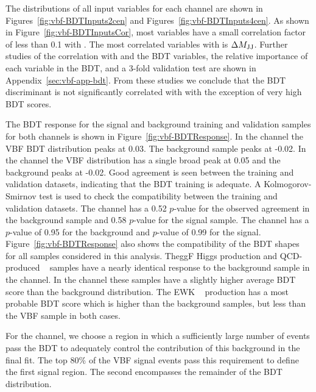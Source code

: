The distributions of all input variables for each channel are
shown in Figures~\ref{fig:vbf-BDTInputs2cen} and Figures~\ref{fig:vbf-BDTInputs4cen}.
As shown in Figure~\ref{fig:vbf-BDTInputsCor}, most variables have a
small correlation factor of less than 0.1 with \Mbb.
The most correlated variables with \Mbb is $\Delta M_{\rm JJ}$.
Further studies of the correlation with \Mbb and the BDT variables,
the relative importance of each variable in the BDT, and a 3-fold
validation test are shown in Appendix~\ref{sec:vbf-app-bdt}.
From these studies we conclude that the BDT discriminant is not
significantly correlated with \Mbb with the exception of very high BDT scores.

The BDT response for  the signal and background training and validation
samples for both channels is shown in Figure~\ref{fig:vbf-BDTResponse}.
In the \fourcentral channel the VBF \Hbb BDT distribution peaks at 0.03.
The background sample peaks at -0.02.  In the \twocentral channel the
VBF \Hbb distribution has a single broad peak at 0.05 and the
background peaks at -0.02. Good agreement is seen between the training
and validation datasets, indicating that the BDT training is adequate.
A Kolmogorov-Smirnov test is used to check the compatibility between
the training and validation datasets.  The \twocentral channel has
a 0.52 $p$-value for the observed agreement in the background sample
and 0.58 $p$-value for the signal sample. The \fourcentral channel has
a $p$-value of 0.95 for the background and $p$-value of 0.99 for the signal.
Figure~\ref{fig:vbf-BDTResponse} also shows the compatibility of the BDT
shapes for all samples considered in this analysis.
TheggF Higgs production and QCD-produced \zjets ~ samples have a
nearly identical response to the background sample in the \fourcentral channel.
In the \twocentral channel these samples have a slightly higher average BDT score than the background distribution.
The EWK \zjets ~ production has a most probable BDT score which is higher than the
background samples, but less than the VBF \Hbb sample in both cases. 

For the \twocentral channel, we choose a region in which
a sufficiently large number of \zjets{} events pass the BDT to
adequately control the contribution of this background in the final fit.
The top 80\% of the VBF signal events pass this requirement to define the first signal region.
The second encompasses the remainder of the BDT distribution.


